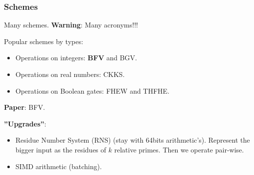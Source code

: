 \documentclass[10pt]{beamer}
\begin{document}
\begin{frame}
    \frametitle{Schemes}

    Many schemes. \textbf{Warning}: Many acronyms!!!

    Popular schemes by types:
    \begin{itemize}\vspace{-0.2cm}
        \item Operations on integers: \textbf{BFV} and BGV.\vspace{-0.2cm}
        \item Operations on real numbers: CKKS.\vspace{-0.2cm}
        \item Operations on Boolean gates: FHEW and THFHE.
    \end{itemize}

    \textbf{Paper}: BFV.

    \textbf{''Upgrades''}:
\begin{itemize}\vspace{-0.2cm}
    \item Residue Number System (RNS) (stay with 64bits arithmetic's).        Represent the bigger input as the residues of $k$ relative primes.
        Then we operate pair-wise.
 \vspace{-0.2cm}
   \item SIMD arithmetic (batching).
\end{itemize}


\end{frame}

\end{document}
